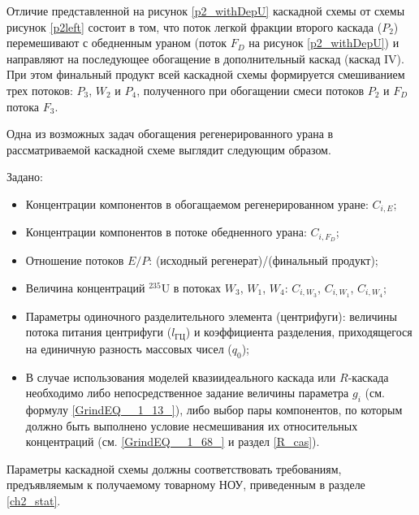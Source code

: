 Отличие представленной на рисунок \ref{p2_withDepU} каскадной схемы от схемы рисунок \ref{p2left} состоит в том, что поток легкой фракции второго каскада ($P_2$) перемешивают с обедненным ураном (поток $F_{D}$ на рисунок \ref{p2_withDepU}) и направляют на последующее обогащение в дополнительный каскад (каскад IV). При этом финальный продукт всей каскадной схемы формируется смешиванием трех потоков: $P_3$, $W_2$ и $P_4$, полученного при обогащении смеси потоков $P_2$ и $F_{D}$ потока $F_3$.

Одна из возможных задач обогащения регенерированного урана в рассматриваемой каскадной схеме выглядит следующим образом.

Задано:

\begin{itemize}
    \item Концентрации компонентов в обогащаемом регенерированном уране: $C_{i,{E}}$;
    \item Концентрации компонентов в потоке обедненного урана: $C_{i,{F_{D}}}$;
    \item Отношение потоков $E/P$: (исходный регенерат)/(финальный продукт);
    \item Величина концентраций $^{235}$U в потоках $W_{3}$, $W_{1}$, $W_{4}$: $C_{i,{W_3}}$, $C_{i,{W_1}}$, $C_{i,{W_4}}$;
    \item Параметры одиночного разделительного элемента (центрифуги): величины потока питания центрифуги ($l_\textit{ГЦ}$) и коэффициента разделения, приходящегося на единичную разность массовых чисел ($q_{0}$);
    \item В случае использования моделей квазиидеального каскада или $R$-каскада необходимо либо непосредственное задание величины параметра $g_i$ (см. формулу \ref{GrindEQ__1_13_}), либо выбор пары компонентов, по которым должно быть выполнено условие несмешивания их относительных концентраций (см. \ref{GrindEQ__1_68_} и раздел \ref{R_cas}).
\end{itemize}

Параметры каскадной схемы должны соответствовать требованиям, предъявляемым к получаемому товарному НОУ, приведенным в разделе \ref{ch2_stat}.


